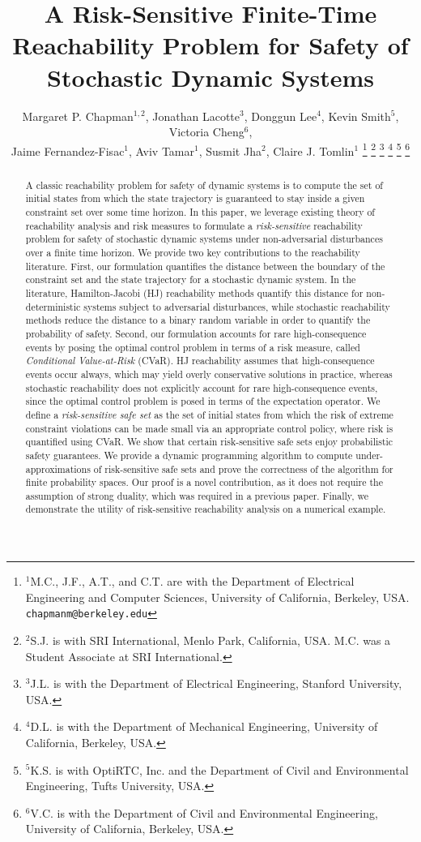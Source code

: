 \documentclass[letterpaper, 10 pt, conference]{ieeeconf}  %
\title{\LARGE \bf
A Risk-Sensitive Finite-Time Reachability Problem for Safety of Stochastic Dynamic Systems}
\author{Margaret P. Chapman$^{1,2}$, Jonathan Lacotte$^{3}$, Donggun Lee$^{4}$, Kevin Smith$^{5}$, Victoria Cheng$^{6}$,\\ 
Jaime Fernandez-Fisac$^{1}$, Aviv Tamar$^{1}$, Susmit Jha$^{2}$, Claire J. Tomlin$^{1}$%
\thanks{$^{1}$M.C., J.F., A.T., and C.T. are with the Department of Electrical Engineering and Computer Sciences, University of California, Berkeley, USA.
        {\tt\small chapmanm@berkeley.edu}}%
\thanks{$^{2}$S.J. is with SRI International, Menlo Park, California, USA. M.C. was a Student Associate at SRI International.
        }%
\thanks{$^{3}$J.L. is with the Department of Electrical Engineering, Stanford University, USA.
        }%
\thanks{$^{4}$D.L. is with the Department of Mechanical Engineering, University of California, Berkeley, USA.
        }%
\thanks{$^{5}$K.S. is with OptiRTC, Inc. and the Department of Civil and Environmental Engineering, Tufts University, USA.
        }%
\thanks{$^{6}$V.C. is with the Department of Civil and Environmental Engineering, University of California, Berkeley, USA.
        }%
}
\begin{document}
\maketitle
\thispagestyle{empty}
\pagestyle{empty}

\begin{abstract}
A classic reachability problem for safety of dynamic systems is to compute the set of initial states from which 
the state trajectory is guaranteed to stay inside a given constraint set over some time horizon. 
In this paper, we leverage existing theory of reachability analysis and risk measures 
to formulate a \textit{risk-sensitive} reachability problem for safety of stochastic dynamic systems under non-adversarial disturbances
over a finite time horizon.
We provide two key contributions to the reachability literature. 
First, our formulation quantifies the distance between the boundary of the constraint set and the state trajectory for a stochastic dynamic system.
In the literature, Hamilton-Jacobi (HJ) reachability methods quantify this distance for non-deterministic systems subject to adversarial disturbances, while
stochastic reachability methods reduce the distance to a binary random variable in order to quantify the probability of safety. 
Second, our formulation accounts for rare high-consequence events by posing the optimal control problem in terms of a risk measure, 
called \textit{Conditional Value-at-Risk} (CVaR).
HJ reachability assumes that high-consequence events occur always, which may yield overly conservative solutions in practice,
whereas stochastic reachability does not explicitly account for rare high-consequence events,
since the optimal control problem is posed in terms of the expectation operator.
We define a \textit{risk-sensitive safe set} as the set of initial states from which the risk of extreme constraint violations
can be made small via an appropriate control policy, where risk is quantified using CVaR.
We show that certain risk-sensitive safe sets enjoy probabilistic safety guarantees.
We provide a dynamic programming algorithm to compute under-approximations of risk-sensitive safe sets
and prove the correctness of the algorithm for finite probability spaces.
Our proof is a novel contribution, as it does not require the assumption of strong duality, which was required in a previous paper.
Finally, we demonstrate the utility of risk-sensitive reachability analysis on a numerical example.
\end{abstract}
\end{document}
